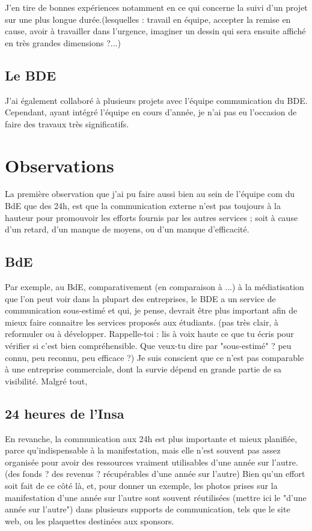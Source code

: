         J'en tire de bonnes expériences notamment en ce qui concerne la suivi d'un projet sur une plus longue durée.(lesquelles : travail en équipe, accepter la remise en cause, avoir à travailler dans l'urgence, imaginer un dessin qui sera ensuite affiché en très grandes dimensions ?...)
        
    \subsection{Le BDE}
    
        J'ai également collaboré à plusieurs projets avec l'équipe communication du BDE.
        Cependant, ayant intégré l'équipe en cours d'année, je n'ai pas eu l'occasion de faire des travaux très significatifs.

\section{Observations}

    La première observation que j'ai pu faire aussi bien au sein de l'équipe com du BdE que des 24h, est que la communication externe n'est pas toujours à la hauteur pour promouvoir les efforts fournis par les autres services ; soit à cause d'un retard, d'un manque de moyens, ou d'un manque d'efficacité.

    \subsection{BdE}

        Par exemple, au BdE, comparativement (en comparaison à ...) à la médiatisation que l'on peut voir dans la plupart des entreprises, le BDE  a un service de communication sous-estimé et qui, je pense, devrait être plus important afin de mieux faire connaitre les services proposés aux étudiants. (pas très clair, à reformuler ou à développer. Rappelle-toi : lis à voix haute ce que tu écris pour vérifier si c'est bien compréhensible. Que veux-tu dire par "sous-estimé" ? peu connu, peu reconnu, peu efficace ?) Je suis conscient que ce n'est pas comparable à une entreprise commerciale, dont  la survie dépend en grande partie de sa visibilité. Malgré tout, %
    
    \subsection{24 heures de l'Insa}
        
        En revanche, la communication aux 24h est plus importante et mieux planifiée, parce qu'indispensable à la manifestation, mais elle n'est souvent pas assez organisée pour avoir des ressources vraiment utilisables d'une année sur l'autre. (des fonds ? des revenus ? récupérables d'une année sur l'autre)
        Bien qu'un effort soit fait de ce côté là, et, pour donner un exemple, les photos prises sur la manifestation d'une année sur l'autre sont souvent réutilisées (mettre ici le "d'une année sur l'autre") dans plusieurs supports de communication, tels que le site web, ou les plaquettes destinées aux sponsors.
        
